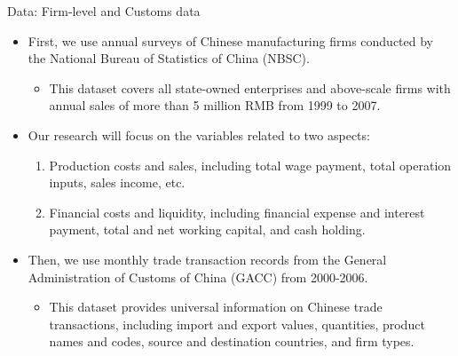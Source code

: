 \documentclass[10pt]{beamer}
\begin{document}
\begin{frame}{Data: Firm-level and Customs data}
    \begin{itemize}
	\item First, we use annual surveys of Chinese manufacturing firms conducted by the National Bureau of Statistics of China (NBSC).
	\begin{itemize}
		\item This dataset covers all state-owned enterprises and above-scale firms with annual sales of more than 5 million RMB from 1999 to 2007. 
	\end{itemize}
        \item Our research will focus on the variables related to two aspects:
        \begin{enumerate}
            \item Production costs and sales, including total wage payment, total operation inputs, sales income, etc.
            \item Financial costs and liquidity, including financial expense and interest payment, total and net working capital, and cash holding.
        \end{enumerate}
        \item Then, we use monthly trade transaction records from the General Administration of Customs of China (GACC) from 2000-2006.
        \begin{itemize}
            \item This dataset provides universal information on Chinese trade transactions, including import and export values, quantities, product names and codes, source and destination countries, and firm types.
	\end{itemize}
         
    \end{itemize}
\end{frame}
\end{document}
